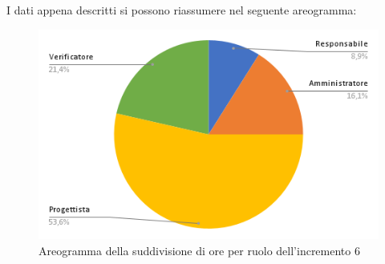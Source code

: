 \pagebreak
I dati appena descritti si possono riassumere nel seguente areogramma:
\begin{figure}[!h]
    \vspace{5px}
    \includegraphics[scale=0.5]{../../../Images/Diagrammi/Diagramma a torta/areogrammaIncremento6.png}
    \centering
    \caption{Areogramma della suddivisione di ore per ruolo dell'incremento 6}
\end{figure}

